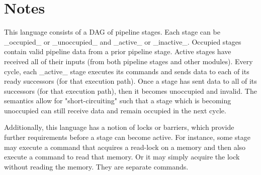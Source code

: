 \documentclass{article}
\begin{document}
\section{Notes}

This language consists of a DAG of pipeline stages.
Each stage can be _occupied_ or _unoccupied_ and _active_ or _inactive_.
Occupied stages contain valid pipeline data from a prior
pipeline stage.
Active stages have received all of their inputs (from both
pipeline stages and other modules).
Every cycle, each _active_ stage executes its commands
and sends data to each of its ready successors (for that execution path).
Once a stage has sent data to all of its successors (for that execution path),
then it becomes unoccupied and invalid.
The semantics allow for "short-circuiting" such that a stage which is
becoming unoccupied can still receive data and remain occupied in the next cycle.

Additionally, this language has a notion of locks or barriers,
which provide further requirements before a stage can become active.
For instance, some stage may execute a command that acquires a read-lock
on a memory and then also execute a command to read that memory. Or it may
simply acquire the lock without reading the memory. They are separate commands.
\end{document}
